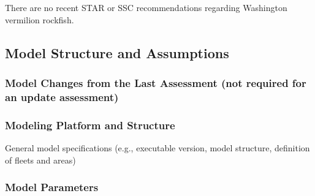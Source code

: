 \documentclass[11pt,
  english,
  a4paper,
]{article}
\begin{document}

There are no recent STAR or SSC recommendations regarding Washington vermilion rockfish.

\leavevmode\tagmcend\tagstructend\par


\hypertarget{model-structure-and-assumptions-1}{%
\subsection{Model Structure and Assumptions}\label{model-structure-and-assumptions-1}}

\leavevmode\tagmcend\tagstructend


\hypertarget{model-changes-from-the-last-assessment-not-required-for-an-update-assessment}{%
\subsubsection{Model Changes from the Last Assessment (not required for an update assessment)}\label{model-changes-from-the-last-assessment-not-required-for-an-update-assessment}}

\leavevmode\tagmcend\tagstructend


\hypertarget{modeling-platform-and-structure}{%
\subsubsection{Modeling Platform and Structure}\label{modeling-platform-and-structure}}

\leavevmode\tagmcend\tagstructend


General model specifications (e.g., executable version, model structure, definition of fleets and areas)

\leavevmode\tagmcend\tagstructend\par


\hypertarget{model-parameters}{%
\subsubsection{Model Parameters}\label{model-parameters}}
\end{document}
